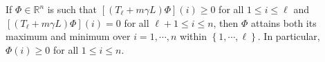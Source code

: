 \documentclass[letterpaper]{article} %
\begin{document}
\begin{lemma}
  \label{lem:maximum-principle}
  If $\Phi\in\mathbb{R}^n$ is such that $\left[\left( T_{\ell}+m\gamma L \right)\Phi\right] \left(i\right)\geq 0$ for all $1\leq i\leq \ell$ and $\left[\left( T_{\ell}+m\gamma L \right)\Phi\right] \left(i\right)=0$ for all $\ell+1\leq i\leq n$, then $\Phi$ attains both its maximum and minimum over $i=1,\cdots,n$ within $\left\{ 1,\cdots,\ell \right\}$. In particular, $\Phi\left(i\right)\geq 0$ for all $1\leq i\leq n$.
\end{lemma}
\end{document}
